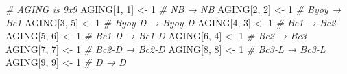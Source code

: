 \documentclass[
  12pt,
]{krantz}
\newenvironment{Shaded}{\begin{snugshade}}{\end{snugshade}}
\newcommand{\CommentTok}[1]{\textcolor[rgb]{0.56,0.35,0.01}{\textit{#1}}}
\newcommand{\DecValTok}[1]{\textcolor[rgb]{0.00,0.00,0.81}{#1}}
\newcommand{\NormalTok}[1]{#1}
\newcommand{\OtherTok}[1]{\textcolor[rgb]{0.56,0.35,0.01}{#1}}
\begin{document}
\begin{Shaded}
\begin{Highlighting}[]
\CommentTok{\# AGING is 9x9}
\NormalTok{AGING[}\DecValTok{1}\NormalTok{, }\DecValTok{1}\NormalTok{] }\OtherTok{\textless{}{-}} \DecValTok{1}   \CommentTok{\# NB → NB}
\NormalTok{AGING[}\DecValTok{2}\NormalTok{, }\DecValTok{2}\NormalTok{] }\OtherTok{\textless{}{-}} \DecValTok{1}   \CommentTok{\# Byoy → Bc1}
\NormalTok{AGING[}\DecValTok{3}\NormalTok{, }\DecValTok{5}\NormalTok{] }\OtherTok{\textless{}{-}} \DecValTok{1}   \CommentTok{\# Byoy{-}D → Byoy{-}D}
\NormalTok{AGING[}\DecValTok{4}\NormalTok{, }\DecValTok{3}\NormalTok{] }\OtherTok{\textless{}{-}} \DecValTok{1}   \CommentTok{\# Bc1 → Bc2}
\NormalTok{AGING[}\DecValTok{5}\NormalTok{, }\DecValTok{6}\NormalTok{] }\OtherTok{\textless{}{-}} \DecValTok{1}   \CommentTok{\# Bc1{-}D → Bc1{-}D}
\NormalTok{AGING[}\DecValTok{6}\NormalTok{, }\DecValTok{4}\NormalTok{] }\OtherTok{\textless{}{-}} \DecValTok{1}   \CommentTok{\# Bc2 → Bc3}
\NormalTok{AGING[}\DecValTok{7}\NormalTok{, }\DecValTok{7}\NormalTok{] }\OtherTok{\textless{}{-}} \DecValTok{1}   \CommentTok{\# Bc2{-}D → Bc2{-}D}
\NormalTok{AGING[}\DecValTok{8}\NormalTok{, }\DecValTok{8}\NormalTok{] }\OtherTok{\textless{}{-}} \DecValTok{1}   \CommentTok{\# Bc3{-}L → Bc3{-}L}
\NormalTok{AGING[}\DecValTok{9}\NormalTok{, }\DecValTok{9}\NormalTok{] }\OtherTok{\textless{}{-}} \DecValTok{1}   \CommentTok{\# D → D}


\end{Highlighting}
\end{Shaded}
\end{document}
